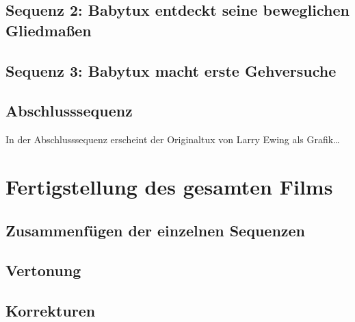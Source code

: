 \documentclass[11pt,parskip]{scrartcl}
\begin{document}
\subsection{Sequenz 2: Babytux entdeckt seine beweglichen Gliedmaßen}


\subsection{Sequenz 3: Babytux macht erste Gehversuche}


\subsection{Abschlusssequenz}
In der Abschlusssequenz erscheint der Originaltux von Larry Ewing als
Grafik\ldots

\newpage


\section{Fertigstellung des gesamten Films}


\subsection{Zusammenfügen der einzelnen Sequenzen}


\subsection{Vertonung}


\subsection{Korrekturen}


\newpage
{}


\end{document}
